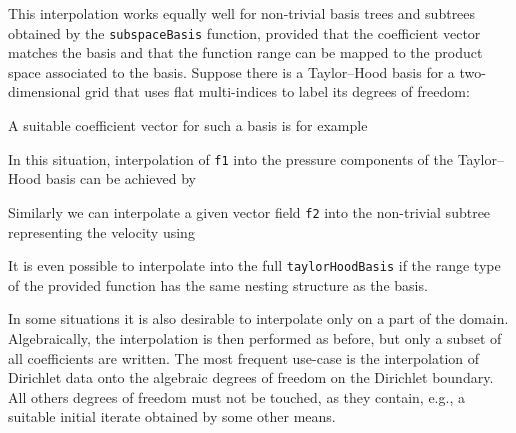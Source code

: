 \documentclass[a4paper,10pt,headings=normal,bibliography=totoc]{scrartcl}
\newcommand{\cpp}[1]{\lstinline[basicstyle=\ttfamily]!#1!}
\begin{document}
This interpolation works equally well for non-trivial basis trees
and subtrees obtained by the \cpp{subspaceBasis} function,
provided that the coefficient vector matches the basis
and that the function range can be mapped to the product space
associated to the basis.  Suppose there is a Taylor--Hood basis for a
two-dimensional grid that uses flat multi-indices to label its
degrees of freedom:
%

%
A suitable coefficient vector for such a basis is for example
%

%
In this situation, interpolation of \cpp{f1} into the pressure components
of the Taylor--Hood basis can be achieved by
%

%
Similarly we can interpolate a given vector field \cpp{f2}
into the non-trivial subtree representing the velocity using
%

%
It is even possible to interpolate into the full \cpp{taylorHoodBasis}
if the range type of the provided function has the same nesting structure
as the basis.


In some situations it is also desirable to interpolate only on a part of the domain.  Algebraically, the interpolation
is then performed as before, but only a subset of all coefficients are written.  The most frequent use-case is the interpolation
of Dirichlet data onto the algebraic degrees of freedom on the Dirichlet boundary.  All others
degrees of freedom must not be touched, as they contain, e.g., a suitable initial iterate obtained by some other
means.
\end{document}
